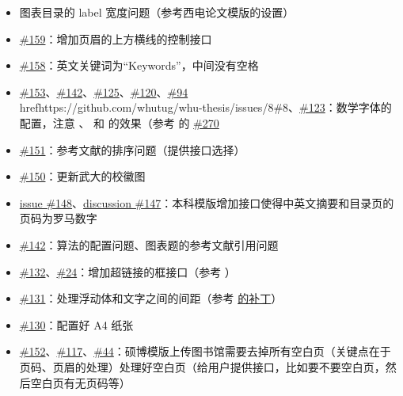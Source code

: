\begin{itemize}
  \item 图表目录的 label 宽度问题（参考西电论文模版的设置）
  \item \href{https://github.com/whutug/whu-thesis/issues/159}{\#159}：增加页眉的上方横线的控制接口
  \item \href{https://github.com/whutug/whu-thesis/issues/158}{\#158}：英文关键词为“Keywords”，中间没有空格
  \item \href{https://github.com/whutug/whu-thesis/issues/153}{\#153}、\href{https://github.com/whutug/whu-thesis/issues/142}{\#142}、\href{https://github.com/whutug/whu-thesis/issues/125}{\#125}、\href{https://github.com/whutug/whu-thesis/issues/120}{\#120}、\href{https://github.com/whutug/whu-thesis/issues/94}{\#94}\\href{https://github.com/whutug/whu-thesis/issues/8}{\#8}、\href{https://github.com/whutug/whu-thesis/discussions/123}{\#123}：数学字体的配置，注意 、 和  的效果（参考  的 \href{https://github.com/stone-zeng/fduthesis/discussions/270}{\#270}
  \item \href{https://github.com/whutug/whu-thesis/issues/151}{\#151}：参考文献的排序问题（提供接口选择）
  \item \href{https://github.com/whutug/whu-thesis/issues/150}{\#150}：更新武大的校徽图
  \item \href{https://github.com/whutug/whu-thesis/issues/148}{issue \#148}、\href{https://github.com/whutug/whu-thesis/discussions/147}{discussion \#147}：本科模版增加接口使得中英文摘要和目录页的页码为罗马数字
  \item \href{https://github.com/whutug/whu-thesis/issues/142}{\#142}：算法的配置问题、图表题的参考文献引用问题
  \item \href{https://github.com/whutug/whu-thesis/issues/132}{\#132}、\href{https://github.com/whutug/whu-thesis/issues/24}{\#24}：增加超链接的框接口（参考 ）
  \item \href{https://github.com/whutug/whu-thesis/issues/131}{\#131}：处理浮动体和文字之间的间距（参考 \href{https://github.com/sikouhjw/gdutthesis/blob/c3cc2de5bfa47f7bf1b88c0884cca60119d6fd82/gdutthesis.cls#L1106-L1132}{ 的补丁}）
  \item \href{https://github.com/whutug/whu-thesis/issues/130}{\#130}：配置好 A4 纸张
  \item \href{https://github.com/whutug/whu-thesis/issues/152}{\#152}、\href{https://github.com/whutug/whu-thesis/issues/117}{\#117}、\href{https://github.com/whutug/whu-thesis/issues/44}{\#44}：硕博模版上传图书馆需要去掉所有空白页（关键点在于页码、页眉的处理）处理好空白页（给用户提供接口，比如要不要空白页，然后空白页有无页码等）

\end{itemize}
